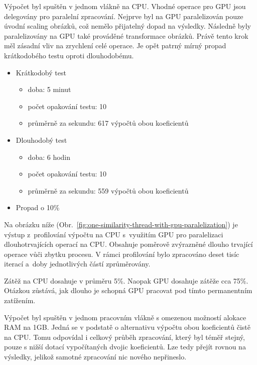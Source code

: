 Výpočet byl spuštěn v jednom vlákně na CPU. Vhodné operace pro GPU jsou delegovány pro paralelní zpracování.
Nejprve byl na GPU paralelizován pouze úvodní scaling obrázků, což nemělo přijatelný dopad na výsledky. Následně byly paralelizovány na GPU také prováděné transformace obrázků. Právě tento krok měl zásadní vliv na zrychlení celé operace.
Je opět patrný mírný propad krátkodobého testu oproti dlouhodobému.
\begin{itemize}
	\setlength{\parskip}{0pt}
	\setlength{\itemsep}{0pt}
	\item {Krátkodobý test}
		\begin{itemize}
			\setlength{\parskip}{0pt}
			\setlength{\itemsep}{0pt}
			\item {doba: 5 minut}
			\item {počet opakování testu: 10}
			\item {průměrně za sekundu: 617 výpočtů obou koeficientů}
		\end{itemize}
	\item {Dlouhodobý test}
		\begin{itemize}
			\setlength{\parskip}{0pt}
			\setlength{\itemsep}{0pt}
			\item {doba: 6 hodin}
			\item {počet opakování testu: 10}
			\item {průměrně za sekundu: 559 výpočtů obou koeficientů}
		\end{itemize}
	\item {Propad o 10\%}
\end{itemize}

Na obrázku níže (Obr.~\ref{fig:one-similarity-thread-with-gpu-paralelization}) je výstup z~profilování výpočtu na CPU s~využitím GPU pro paralelizaci dlouhotrvajících operací na CPU. Obsahuje poměrově zvýrazněné dlouho trvající operace vůči zbytku procesu. V rámci profilování bylo zpracováno deset tisíc iterací a~doby jednotlivých částí zprůměrovány.

Zátěž na CPU dosahuje v průměru 5\%. Naopak GPU dosahuje zátěže cca 75\%. Otázkou zůstává, jak dlouho je schopná GPU pracovat pod tímto permanentním zatížením.

Výpočet byl spuštěn v jednom pracovním vlákně s omezenou možností alokace RAM na 1GB. Jedná se v podstatě o alternativu výpočtu obou koeficientů čistě na CPU. Tomu odpovídal i celkový průběh zpracování, který byl téměř stejný, pouze s nižší dotací vypočítaných dvojic koeficientů.
Lze tedy přejít rovnou na výsledky, jelikož samotné zpracování nic nového nepřineslo.

